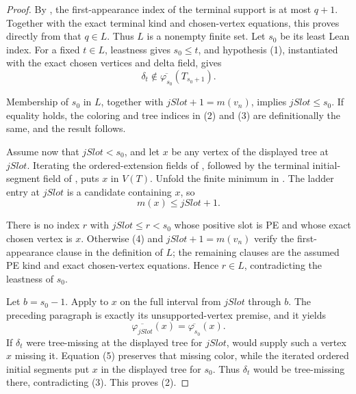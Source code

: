 \begin{proof}
By , the first-appearance
index of the terminal support is at most \(q+1\).  Together with the exact
terminal kind and chosen-vertex equations, this proves directly from
 that \(q\in L\).  Thus \(L\) is a
nonempty finite set.  Let \(s_0\) be its least Lean index.  For a fixed
\(t\in L\), leastness gives \(s_0\le t\), and hypothesis (1), instantiated
with the exact chosen vertices and delta field, gives
\[
 \delta_t\notin\overline{\varphi_{s_0}}(T_{s_0+1}).         \tag{3}
\]

Membership of \(s_0\) in \(L\), together with
\(jSlot+1=m(v_n)\), implies \(jSlot\le s_0\).  If equality holds, the
coloring and tree indices in (2) and (3) are definitionally the same, and
the result follows.

Assume now that \(jSlot<s_0\), and let \(x\) be any vertex of the displayed
tree at \(jSlot\).  Iterating the ordered-extension fields of
, followed by the terminal initial-segment field
of , puts \(x\) in \(V(T)\).  Unfold the
finite minimum in .  The ladder entry at
\(jSlot\) is a candidate containing \(x\), so
\[
                         m(x)\le jSlot+1.                    \tag{4}
\]

There is no index \(r\) with \(jSlot\le r<s_0\) whose positive slot is PE
and whose exact chosen vertex is \(x\).  Otherwise (4) and
\(jSlot+1=m(v_n)\) verify the first-appearance clause in the definition of
\(L\); the remaining clauses are the assumed PE kind and exact chosen-vertex
equations.  Hence \(r\in L\), contradicting the leastness of \(s_0\).

Let \(b=s_0-1\).  Apply  to \(x\) on
the full interval from \(jSlot\) through \(b\).  The preceding paragraph is
exactly its unsupported-vertex premise, and it yields
\[
 \overline{\varphi_{jSlot}}(x)
   =\overline{\varphi_{s_0}}(x).                             \tag{5}
\]
If \(\delta_t\) were tree-missing at the displayed tree for \(jSlot\),
 would supply such a vertex \(x\) missing it.
Equation (5) preserves that missing color, while the iterated ordered
initial segments put \(x\) in the displayed tree for \(s_0\).  Thus
\(\delta_t\) would be tree-missing there, contradicting (3).  This proves
(2).
\end{proof}

